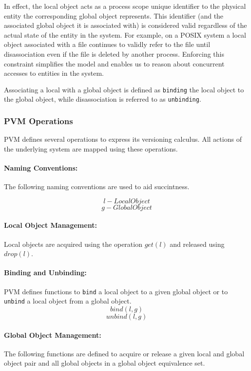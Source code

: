 \documentclass[withindex,glossary]{cam-thesis}
\begin{document}
In effect, the local object acts as a process scope unique identifier to the physical entity the corresponding global object represents.
This identifier (and the associated global object it is associated with) is considered valid regardless of the actual state of the entity in the system.
For example, on a POSIX system a local object associated with a file continues to validly refer to the file until disassociation even if the file is deleted by another process.
Enforcing this constraint simplifies the model and enables us to reason about concurrent accesses to entities in the system.

Associating a local with a global object is defined as \texttt{binding} the local object to the global object, while disassociation is referred to as \texttt{unbinding}.

\subsubsection{PVM Operations}
PVM defines several operations to express its versioning calculus. All actions of the underlying system are mapped using these operations.

\paragraph{Naming Conventions:}
The following naming conventions are used to aid succintness.

$$l - Local Object$$
$$g - Global Object$$

\paragraph{Local Object Management:}
Local objects are acquired using the operation $get(l)$ and released using $drop(l)$.

\paragraph{Binding and Unbinding:}
PVM defines functions to \texttt{bind} a local object to a given global object or to \texttt{unbind} a local object from a global object.
$$bind(l, g)$$
$$unbind(l, g)$$

\paragraph{Global Object Management:}
The following functions are defined to acquire or release a given local and global object pair and all global objects in a global object equivalence set.
\end{document}
